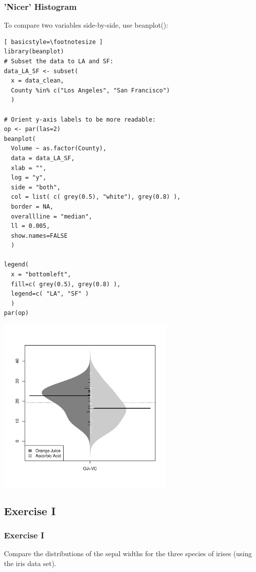 \begin{frame}
	\frametitle{'Nicer' Histogram}

To compare two variables side-by-side, use \ttfamily beanplot(): \normalfont

	\begin{lstlisting}[ basicstyle=\footnotesize ]
library(beanplot)
# Subset the data to LA and SF:
data_LA_SF <- subset(
  x = data_clean, 
  County %in% c("Los Angeles", "San Francisco") 
  )

# Orient y-axis labels to be more readable:
op <- par(las=2)
beanplot(
  Volume ~ as.factor(County), 
  data = data_LA_SF, 
  xlab = "",
  log = "y",
  side = "both", 
  col = list( c( grey(0.5), "white"), grey(0.8) ), 
  border = NA, 
  overallline = "median", 
  ll = 0.005,
  show.names=FALSE
  )

legend(
  x = "bottomleft",
  fill=c( grey(0.5), grey(0.8) ), 
  legend=c( "LA", "SF" )
  )
par(op)
	\end{lstlisting}

\newpage
        \begin{center}
	         \includegraphics[width=0.65\textwidth]{images/beanplot.pdf}
        \end{center}

\end{frame}



\subsection{Exercise I}
\begin{frame}
	\frametitle{Exercise I}
	Compare the distributions of the sepal widths for the three species of irises (using the \ttfamily iris \normalfont data set).
\end{frame}